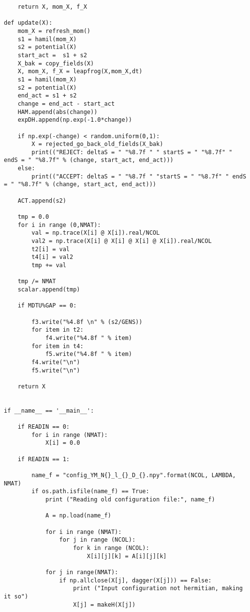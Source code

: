 \begin{lstlisting}
    return X, mom_X, f_X

def update(X):
    mom_X = refresh_mom()
    s1 = hamil(mom_X)
    s2 = potential(X)
    start_act =  s1 + s2
    X_bak = copy_fields(X) 
    X, mom_X, f_X = leapfrog(X,mom_X,dt)
    s1 = hamil(mom_X)
    s2 = potential(X)
    end_act = s1 + s2
    change = end_act - start_act
    HAM.append(abs(change))
    expDH.append(np.exp(-1.0*change))   

    if np.exp(-change) < random.uniform(0,1):
        X = rejected_go_back_old_fields(X_bak)
        print(("REJECT: deltaS = " "%8.7f " " startS = " "%8.7f" " endS = " "%8.7f" % (change, start_act, end_act)))
    else:   
        print(("ACCEPT: deltaS = " "%8.7f " "startS = " "%8.7f" " endS = " "%8.7f" % (change, start_act, end_act)))

    ACT.append(s2)

    tmp = 0.0 
    for i in range (0,NMAT):
        val = np.trace(X[i] @ X[i]).real/NCOL
        val2 = np.trace(X[i] @ X[i] @ X[i] @ X[i]).real/NCOL
        t2[i] = val 
        t4[i] = val2 
        tmp += val 

    tmp /= NMAT 
    scalar.append(tmp) 

    if MDTU%GAP == 0:

        f3.write("%4.8f \n" % (s2/GENS))
        for item in t2:
            f4.write("%4.8f " % item)
        for item in t4:
            f5.write("%4.8f " % item)
        f4.write("\n")
        f5.write("\n") 

    return X


if __name__ == '__main__':

    if READIN == 0:
        for i in range (NMAT):  
            X[i] = 0.0  

    if READIN == 1:

        name_f = "config_YM_N{}_l_{}_D_{}.npy".format(NCOL, LAMBDA, NMAT)
        if os.path.isfile(name_f) == True: 
            print ("Reading old configuration file:", name_f)
            
            A = np.load(name_f)

            for i in range (NMAT):
                for j in range (NCOL):
                    for k in range (NCOL):
                        X[i][j][k] = A[i][j][k] 

            for j in range(NMAT):
                if np.allclose(X[j], dagger(X[j])) == False:
                    print ("Input configuration not hermitian, making it so")
                    X[j] = makeH(X[j])


\end{lstlisting}

